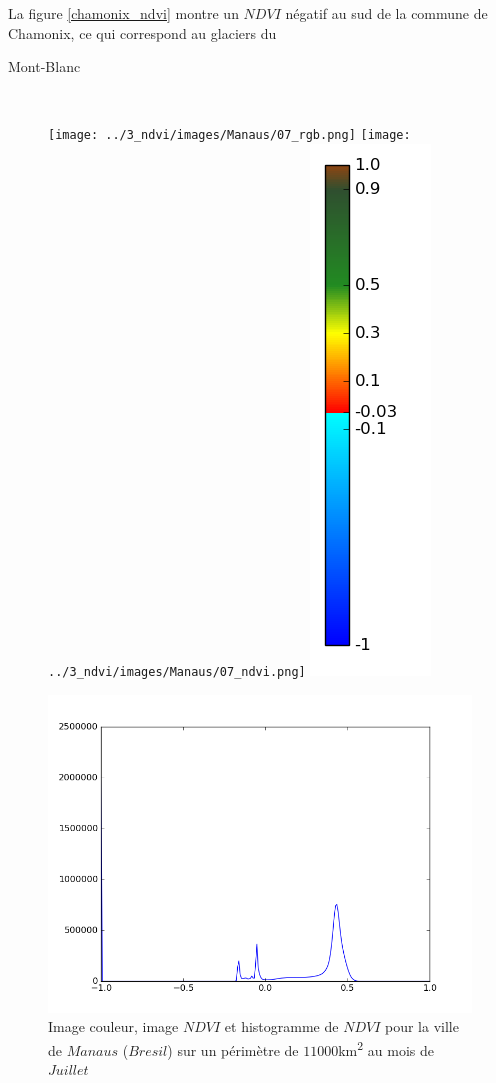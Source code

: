 \documentclass{book}
\begin{document}
La figure \ref{chamonix_ndvi} montre un $NDVI$ négatif au sud de la commune de Chamonix, ce qui correspond au glaciers du \begin{itshape}Mont-Blanc\end{itshape}\\

\clearpage 

\begin{figure}[H]
\centerline{
\texttt{[image: ../3\_ndvi/images/Manaus/07\_rgb.png]}
\texttt{[image: ../3\_ndvi/images/Manaus/07\_ndvi.png]}
\includegraphics[scale=0.4]{../3_ndvi/images/colormap.png}
}
\begin{center}
\includegraphics[scale=0.45]{../3_ndvi/images/Manaus/07_ndvi_histo.png}
\end{center}
\caption{Image couleur, image $NDVI$ et histogramme de $NDVI$ pour la ville de $Manaus$ ($Bresil$) sur un périmètre de $11000$km\textsuperscript{2} au mois de $Juillet$}
\label{manaus_ndvi}
\end{figure}
\end{document}
